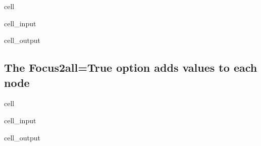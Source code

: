 \documentclass[letterpaper,10pt,english]{jupyterBook}
\begin{document}
\begin{sphinxuseclass}{cell}\begin{sphinxVerbatimInput}

\begin{sphinxuseclass}{cell_input}
\begin{sphinxVerbatim}[commandchars=\\\{\}]
  
\end{sphinxVerbatim}

\end{sphinxuseclass}\end{sphinxVerbatimInput}
\begin{sphinxVerbatimOutput}

\begin{sphinxuseclass}{cell_output}
\noindent{}

\end{sphinxuseclass}\end{sphinxVerbatimOutput}

\end{sphinxuseclass}

\subsection{The Focus2all=True  option  adds values to each node}
\label{\detokenize{content/06_ModelAnalytics/ModelStructure:the-focus2all-true-option-adds-values-to-each-node}}
\begin{sphinxuseclass}{cell}\begin{sphinxVerbatimInput}

\begin{sphinxuseclass}{cell_input}
\begin{sphinxVerbatim}[commandchars=\\\{\}]
 
      
\end{sphinxVerbatim}

\end{sphinxuseclass}\end{sphinxVerbatimInput}
\begin{sphinxVerbatimOutput}

\begin{sphinxuseclass}{cell_output}
\noindent{}

\end{sphinxuseclass}\end{sphinxVerbatimOutput}

\end{sphinxuseclass}
\end{document}
